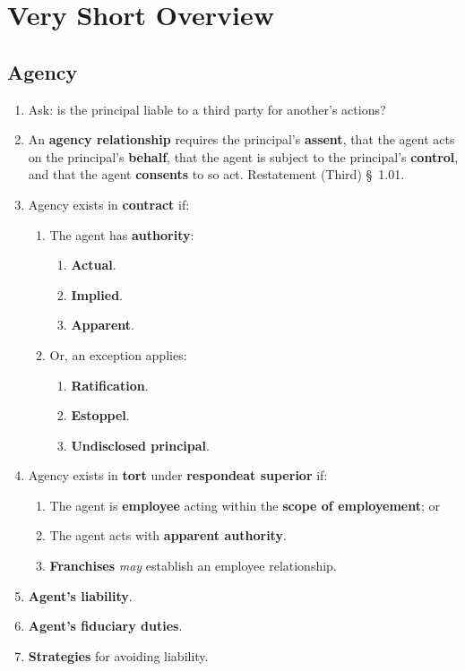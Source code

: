 \section{Very Short Overview}

\subsection{Agency}

\begin{enumerate}
    \item Ask: is the principal liable to a third party for another's actions?
    \item An \textbf{agency relationship} requires the principal's 
    \textbf{assent}, that the agent acts on the principal's \textbf{behalf}, 
    that the agent is subject to the principal's \textbf{control}, and that 
    the agent \textbf{consents} to so act. Restatement (Third) \S\ 1.01.
    \item Agency exists in \textbf{contract} if:
    \begin{enumerate}
        \item The agent has \textbf{authority}:
        \begin{enumerate}
            \item \textbf{Actual}.
            \item \textbf{Implied}.
            \item \textbf{Apparent}.
        \end{enumerate}
        \item Or, an exception applies:
        \begin{enumerate}
            \item \textbf{Ratification}.
            \item \textbf{Estoppel}.
            \item \textbf{Undisclosed principal}.
        \end{enumerate}
    \end{enumerate}
    \item Agency exists in \textbf{tort} under \textbf{respondeat superior} 
    if:
    \begin{enumerate}
        \item The agent is \textbf{employee} acting within the \textbf{scope 
        of employement}; or
        \item The agent acts with \textbf{apparent authority}.
        \item \textbf{Franchises} \emph{may} establish an employee 
        relationship.
    \end{enumerate}
    \item \textbf{Agent's liability}.
    \item \textbf{Agent's fiduciary duties}.
    \item \textbf{Strategies} for avoiding liability.
\end{enumerate}

